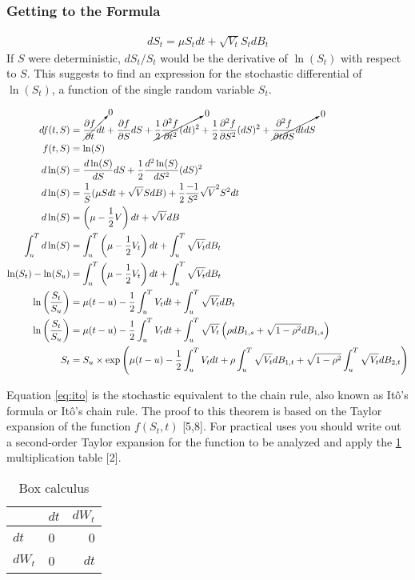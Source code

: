 \documentclass[12pt,twoside]{reedthesis}
\theoremstyle{definition}
\theoremstyle{definition}
\theoremstyle{remark}
\begin{document}
  \subsubsection{Getting to the Formula}\label{getting-to-the-formula}
  \begin{align}
  dS_t = \mu S_t dt + \sqrt{V_t} S_t dB_t
  \end{align}
  If \(S\) were deterministic, \(dS_t/S_t\) would be the derivative of
  \(\ln(S_t)\) with respect to \(S\). This suggests to find an expression
  for the stochastic differential of \(\ln(S_t)\), a function of the
  single random variable \(S_t\).
  \begin{scriptsize}
  \begin{align}
  df(t,S) &= \cancelto{0}{\frac{\partial f}{\partial t}dt}  + \frac{\partial f}{\partial S} dS + \cancelto{0}{\frac{1}{2} \frac{\partial^2 f}{\partial t^2} (dt)^2} + \frac{1}{2} \frac{\partial^2 f}{\partial S^2} (dS)^2  + \cancelto{0}{\frac{\partial^2 f}{\partial t \partial S} dt dS} \\
  f(t,S) &= \ln(S) \\
  d\ln(S) &= \frac{d\ln(S)}{dS} dS + \frac{1}{2} \frac{d^2\ln(S)}{dS^2}(dS)^2 \\
  d\ln(S) &= \frac{1}{S} (\mu S dt + \sqrt{V} S dB) + \frac{1}{2}\frac{-1}{S^2}\sqrt{V}^2 S^2 dt \\
  d\ln(S) &= \left( \mu -  \frac{1}{2} V \right) dt + \sqrt{V} dB \\
  \int_{u}^{T}{d\ln(S)} &= \int_{u}^{T}{\left( \mu - \frac{1}{2} V_t \right) dt} + \int_{u}^{T}{\sqrt{V_t}dB_t} \\
  \ln(S_t) - \ln(S_u) &= \int_{u}^{T}{\left( \mu - \frac{1}{2} V_t \right) dt} + \int_{u}^{T}{\sqrt{V_t}dB_t} \\
  \ln \left( \frac{S_t}{S_u} \right) &= \mu (t-u) - \frac{1}{2}\int_{u}^{T}{V_t dt} + \int_{u}^{T}{\sqrt{V_t} dB_t} \\
  \ln \left( \frac{S_t}{S_u} \right) &= \mu (t-u) - \frac{1}{2}\int_{u}^{T}{V_t dt} + \int_{u}^{T}{\sqrt{V_t} \left(\rho dB_{1,s} + \sqrt{1-\rho^2} dB_{1,s} \right)} \\
  S_t &= S_u \times \exp \left( \mu (t-u) - \frac{1}{2} \int_{u}^{T}{V_t dt} + \rho \int_{u}^{T}{\sqrt{V_t}dB_{1,t}}+ \sqrt{1 - \rho^2} \int_{u}^{T}{\sqrt{V_t}dB_{2,t}} \right)
  \end{align}
  \end{scriptsize}
  Equation \eqref{eq:ito} is the stochastic equivalent to the chain rule,
  also known as Itô's formula or Itô's chain rule. The proof to this
  theorem is based on the Taylor expansion of the function \(f(S_t, t)\)
  {[}5,8{]}. For practical uses you should write out a second-order Taylor
  expansion for the function to be analyzed and apply the
  \ref{tab:box-calc} multiplication table {[}2{]}.
  \begin{longtable}[t]{llr}
  \caption{\label{tab:box-calc}Box calculus}\\
  \toprule
    & $dt$ & $dW_t$\\
  \midrule
  $dt$ & 0 & 0\\
  $dW_t$ & 0 & $dt$\\
  \bottomrule
  \end{longtable}
\end{document}
